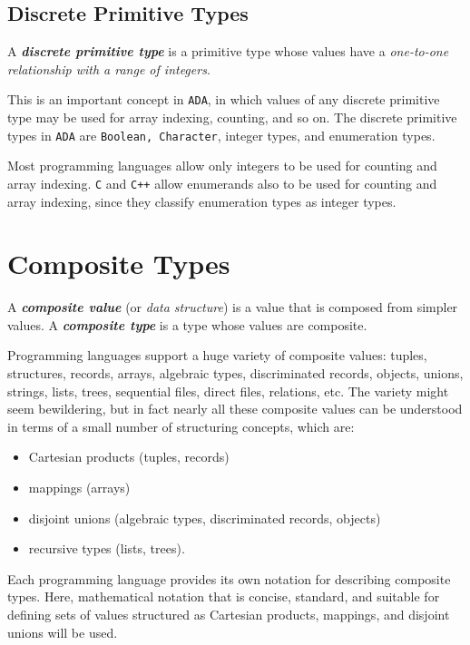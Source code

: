 \documentclass{article}
\begin{document}
\subsection{Discrete Primitive Types}

A \textbf{\textit{discrete primitive type}} is a primitive type whose values have a \textit{one-to-one relationship with a range of integers}.

This is an important concept in \texttt{ADA}, in which values of any discrete primitive type may be used for array indexing, counting, and so on. The discrete primitive types in \texttt{ADA} are \texttt{Boolean, Character}, integer types, and enumeration types.

Most programming languages allow only integers to be used for counting and array indexing. \texttt{C} and \texttt{C++} allow enumerands also to be used for counting and array indexing, since they classify enumeration types as integer types.


\section{Composite Types}

A \textbf{\textit{composite value}} (or \textit{data structure}) is a value that is composed from simpler values. A \textbf{\textit{composite type}} is a type whose values are composite.

Programming languages support a huge variety of composite values: tuples, structures, records, arrays, algebraic types, discriminated records, objects, unions, strings, lists, trees, sequential files, direct files, relations, etc. The variety might seem bewildering, but in fact nearly all these composite values can be understood in terms of a small number of structuring concepts, which are:
\begin{itemize}
    \item Cartesian products (tuples, records)
    \item mappings (arrays)
    \item disjoint unions (algebraic types, discriminated records, objects)
    \item recursive types (lists, trees).
\end{itemize}

Each programming language provides its own notation for describing composite types. Here, mathematical notation that is concise, standard, and suitable for defining sets of values structured as Cartesian products, mappings, and disjoint unions will be used.
\end{document}
